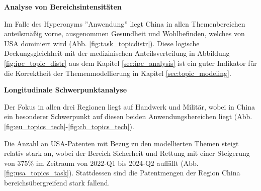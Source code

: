 \textbf{Analyse von Bereichsintensitäten}

Im Falle des Hyperonyms ''Anwendung'' liegt China in allen Themenbereichen anteilsmäßig vorne, ausgenommen Gesundheit und Wohlbefinden, welches von USA dominiert wird (Abb. \ref{fig:task_topicdistr}). Diese logische Deckungsgleichheit mit der medizinischen Anteilsverteilung in Abbildung \ref{fig:ipc_topic_distr} aus dem Kapitel \ref{sec:ipc_analysis} ist ein guter Indikator für die Korrektheit der Themenmodellierung in Kapitel \ref{sec:topic_modeling}.

\textbf{Longitudinale Schwerpunktanalyse}

Der Fokus in allen drei Regionen liegt auf Handwerk und Militär, wobei in China ein besonderer Schwerpunkt auf diesen beiden Anwendungsbereichen liegt (Abb. \ref{fig:eu_topics_tech}-\ref{fig:ch_topics_tech}).

Die Anzahl an USA-Patenten mit Bezug zu den modellierten Themen steigt relativ stark an, wobei der Bereich Sicherheit und Rettung mit einer Steigerung von $375\%$ im Zeitraum von 2022-Q1 bis 2024-Q2 auffällt (Abb. \ref{fig:usa_topics_task}). Stattdessen sind die Patentmengen der Region China bereichsübergreifend stark fallend.


